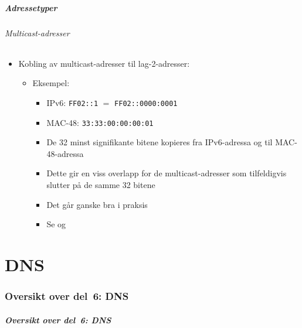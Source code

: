 \begin{frame}%
  \frametitle{Adressetyper}
  \framesubtitle{Multicast-adresser}
  \begin{itemize}[<+->]
  \item Kobling av multicast-adresser til lag-2-adresser:
    \begin{itemize}[<+->]
    \item Eksempel:
      \begin{itemize}[<+->]
      \item IPv6: \texttt{FF02::1} $=$
        \texttt{FF02::\alert<5->{0000}:\alert<5->{0001}}
      \item MAC-48:
        \texttt{33:33:\alert<5->{00}:\alert<5->{00}:\alert<5->{00}:\alert<5->{01}}
      \item De 32 minst signifikante bitene kopieres fra IPv6-adressa
        og til MAC-48-adressa
      \item Dette gir en viss overlapp for de multicast-adresser som
        tilfeldigvis slutter på de samme 32 bitene
      \item Det går ganske bra i praksis
      \item Se  og 
      \end{itemize}
    \end{itemize}
  \end{itemize}
\end{frame}

\part{DNS}

\begin{frame}
  \partpage
\end{frame}

\section*{Oversikt over del~6: DNS}
\begin{frame}[allowframebreaks]
  \frametitle{Oversikt over del~6: DNS}
    \tableofcontents%
\end{frame}

